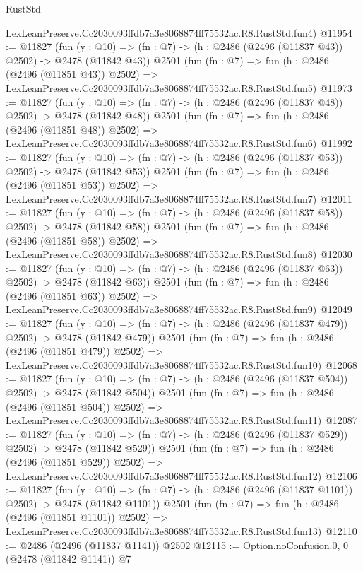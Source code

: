 \begin{lexlean}{RustStd}
\begin{coremodule}
    LexLeanPreserve.Cc2030093ffdb7a3e8068874ff75532ac.R8.RustStd.fun4)
@11954 := @11827
    (fun (y : @10) => (fn : @7) -> (h : @2486 (@2496 (@11837 @43)) @2502) -> @2478 (@11842 @43))
    @2501
    (fun (fn : @7) =>
    fun (h : @2486 (@2496 (@11851 @43)) @2502) =>
    LexLeanPreserve.Cc2030093ffdb7a3e8068874ff75532ac.R8.RustStd.fun5)
@11973 := @11827
    (fun (y : @10) => (fn : @7) -> (h : @2486 (@2496 (@11837 @48)) @2502) -> @2478 (@11842 @48))
    @2501
    (fun (fn : @7) =>
    fun (h : @2486 (@2496 (@11851 @48)) @2502) =>
    LexLeanPreserve.Cc2030093ffdb7a3e8068874ff75532ac.R8.RustStd.fun6)
@11992 := @11827
    (fun (y : @10) => (fn : @7) -> (h : @2486 (@2496 (@11837 @53)) @2502) -> @2478 (@11842 @53))
    @2501
    (fun (fn : @7) =>
    fun (h : @2486 (@2496 (@11851 @53)) @2502) =>
    LexLeanPreserve.Cc2030093ffdb7a3e8068874ff75532ac.R8.RustStd.fun7)
@12011 := @11827
    (fun (y : @10) => (fn : @7) -> (h : @2486 (@2496 (@11837 @58)) @2502) -> @2478 (@11842 @58))
    @2501
    (fun (fn : @7) =>
    fun (h : @2486 (@2496 (@11851 @58)) @2502) =>
    LexLeanPreserve.Cc2030093ffdb7a3e8068874ff75532ac.R8.RustStd.fun8)
@12030 := @11827
    (fun (y : @10) => (fn : @7) -> (h : @2486 (@2496 (@11837 @63)) @2502) -> @2478 (@11842 @63))
    @2501
    (fun (fn : @7) =>
    fun (h : @2486 (@2496 (@11851 @63)) @2502) =>
    LexLeanPreserve.Cc2030093ffdb7a3e8068874ff75532ac.R8.RustStd.fun9)
@12049 := @11827
    (fun (y : @10) => (fn : @7) -> (h : @2486 (@2496 (@11837 @479)) @2502) -> @2478 (@11842 @479))
    @2501
    (fun (fn : @7) =>
    fun (h : @2486 (@2496 (@11851 @479)) @2502) =>
    LexLeanPreserve.Cc2030093ffdb7a3e8068874ff75532ac.R8.RustStd.fun10)
@12068 := @11827
    (fun (y : @10) => (fn : @7) -> (h : @2486 (@2496 (@11837 @504)) @2502) -> @2478 (@11842 @504))
    @2501
    (fun (fn : @7) =>
    fun (h : @2486 (@2496 (@11851 @504)) @2502) =>
    LexLeanPreserve.Cc2030093ffdb7a3e8068874ff75532ac.R8.RustStd.fun11)
@12087 := @11827
    (fun (y : @10) => (fn : @7) -> (h : @2486 (@2496 (@11837 @529)) @2502) -> @2478 (@11842 @529))
    @2501
    (fun (fn : @7) =>
    fun (h : @2486 (@2496 (@11851 @529)) @2502) =>
    LexLeanPreserve.Cc2030093ffdb7a3e8068874ff75532ac.R8.RustStd.fun12)
@12106 := @11827
    (fun (y : @10) => (fn : @7) -> (h : @2486 (@2496 (@11837 @1101)) @2502) -> @2478 (@11842 @1101))
    @2501
    (fun (fn : @7) =>
    fun (h : @2486 (@2496 (@11851 @1101)) @2502) =>
    LexLeanPreserve.Cc2030093ffdb7a3e8068874ff75532ac.R8.RustStd.fun13)
@12110 := @2486 (@2496 (@11837 @1141)) @2502
@12115 := Option.noConfusion.{0, 0} (@2478 (@11842 @1141)) @7

\end{coremodule}
\end{lexlean}
